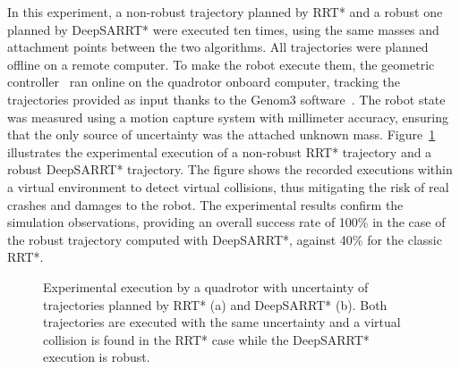 In this experiment, a non-robust trajectory planned by RRT* and a robust one planned by DeepSARRT* were executed ten times, using the same masses and attachment points between the two algorithms.
All trajectories were planned offline on a remote computer. 
To make the robot execute them, the geometric controller~\cite{cLee} ran online on the quadrotor onboard computer, tracking the trajectories provided as input thanks to the Genom3 software~\cite{cGenom3}. 
The robot state was measured using a motion capture system with millimeter accuracy, ensuring that the only source of uncertainty was the attached unknown mass.
Figure~\ref{fig: exp window} illustrates the experimental execution of a non-robust RRT* trajectory and a robust DeepSARRT* trajectory. 
The figure shows the recorded executions within a virtual environment to detect virtual collisions, thus mitigating the risk of real crashes and damages to the robot.
The experimental results confirm the simulation observations, providing an overall success rate of 100\% in the case of the robust trajectory computed with DeepSARRT*, against 40\% for the classic RRT*.

\begin{figure} [h!]
    \centering
    \caption{Experimental execution by a quadrotor with uncertainty of trajectories planned by RRT* (a) and DeepSARRT* (b). 
    Both trajectories are executed with the same uncertainty and a virtual collision is found in the RRT* case while the DeepSARRT* execution is robust.}%
    \label{fig: exp window}%
\end{figure}

